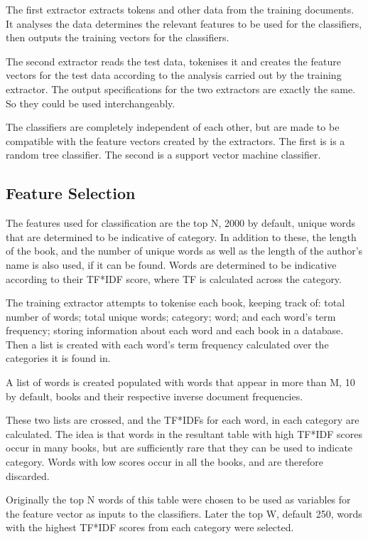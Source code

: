 \documentclass[11pt]{article}
\begin{document}
The first extractor extracts tokens and other data from the training documents.
It analyses the data determines the relevant features to be used for the
classifiers, then outputs the training vectors for the classifiers. 

The second extractor reads the test data, tokenises it and creates the feature
vectors for the test data according to the analysis carried out by the training
extractor. The output specifications for the two extractors are exactly the
same. So they could be used interchangeably.

The classifiers are completely independent of each other, but are made to be
compatible with the feature vectors created by the extractors. The first is is a
random tree classifier. The second is a support vector machine classifier.

\subsection{Feature Selection}

The features used for classification are the top N, 2000 by default, unique
words that are determined to be indicative of category. In addition to these,
the length of the book, and the number of unique words as well as the length of
the author's name is also used, if it can be found.  Words are determined to be
indicative according to their TF*IDF score, where TF is calculated across the
category.

The training extractor attempts to tokenise each book, keeping track of: total
number of words; total unique words; category; word; and each word's term
frequency; storing information about each word and each book in a database.
Then a list is created with each word's term frequency calculated over the
categories it is found in.

A list of words is created populated with words that appear in more than M, 10
by default, books and their respective inverse document frequencies. 

These two lists are crossed, and the TF*IDFs for each word, in each category are
calculated. The idea is that words in the resultant table with high TF*IDF
scores occur in many books, but are sufficiently rare that they can be used to
indicate category. Words with low scores occur in all the books, and are
therefore discarded.

Originally the top N words of this table were chosen to be used as variables for
the feature vector as inputs to the classifiers. Later the top W, default 250,
words with the highest TF*IDF scores from each category were selected.
\end{document}
